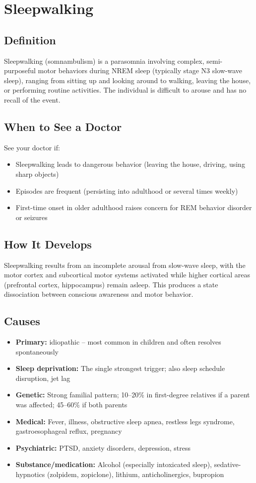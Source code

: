 \chapter{Sleepwalking}

\section*{Definition}
Sleepwalking (somnambulism) is a parasomnia involving complex, semi-purposeful motor behaviors during NREM sleep (typically stage N3 slow-wave sleep), ranging from sitting up and looking around to walking, leaving the house, or performing routine activities. The individual is difficult to arouse and has no recall of the event.

\section*{When to See a Doctor}
See your doctor if:
\begin{itemize}
  \item Sleepwalking leads to dangerous behavior (leaving the house, driving, using sharp objects)
  \item Episodes are frequent (persisting into adulthood or several times weekly)
  \item First-time onset in older adulthood raises concern for REM behavior disorder or seizures
\end{itemize}

\section*{How It Develops}
Sleepwalking results from an incomplete arousal from slow-wave sleep, with the motor cortex and subcortical motor systems activated while higher cortical areas (prefrontal cortex, hippocampus) remain asleep. This produces a state dissociation between conscious awareness and motor behavior.

\section*{Causes}
\begin{itemize}
  \item \textbf{Primary:} idiopathic -- most common in children and often resolves spontaneously
  \item \textbf{Sleep deprivation:} The single strongest trigger; also sleep schedule disruption, jet lag
  \item \textbf{Genetic:} Strong familial pattern; 10--20\% in first-degree relatives if a parent was affected; 45--60\% if both parents
  \item \textbf{Medical:} Fever, illness, obstructive sleep apnea, restless legs syndrome, gastroesophageal reflux, pregnancy
  \item \textbf{Psychiatric:} PTSD, anxiety disorders, depression, stress
  \item \textbf{Substance/medication:} Alcohol (especially intoxicated sleep), sedative-hypnotics (zolpidem, zopiclone), lithium, anticholinergics, bupropion
\end{itemize}

